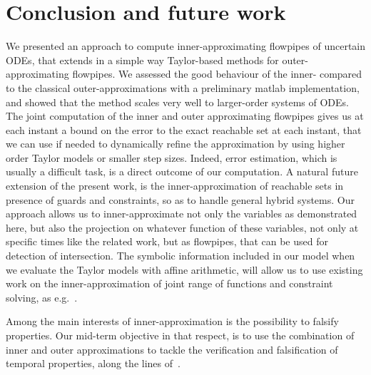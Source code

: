 \documentclass{sig-alternate-05-2015} %
\begin{document}
\section{Conclusion and future work}
%
We presented an approach to compute inner-approxima\-ting flowpipes of uncertain ODEs, that extends in a simple way Taylor-based 
methods for outer-approximating flowpipes. We assessed the good behaviour of the inner- compared to the classical outer-approximations
with a preliminary matlab implementation, and showed that the method scales very well to larger-order systems of ODEs. 
The joint computation of the inner and outer approximating flowpipes gives us at each instant a bound on the error to the exact reachable 
set at each instant, that we can use if needed to dynamically refine the approximation by using higher order Taylor models or smaller step sizes. 
Indeed, error estimation, which is usually a difficult task, is a direct outcome of our computation.
A natural future extension of the present work, is the inner-approximation of reachable sets 
in presence of guards and constraints, so as to handle general hybrid systems. Our approach allows us to inner-approximate 
not only the variables as demonstrated here, but also the projection on whatever function of these variables, not only at 
specific times like the related work, but as flowpipes, that can be used for detection of intersection. 
The symbolic information included in our model  when we evaluate the Taylor models with affine arithmetic, 
will allow us to use existing work on the inner-approximation 
of joint range of functions and constraint solving, as e.g.~\cite{DBLP:journals/constraints/IshiiGJ12}.  

Among the main interests of inner-approximation is the possibility to falsify properties. Our mid-term objective in that respect, 
is to use the combination of inner and outer approximations to tackle the verification and falsification of temporal properties, 
along the lines of~\cite{falsification2,IshiiYG16}. 
\end{document}
